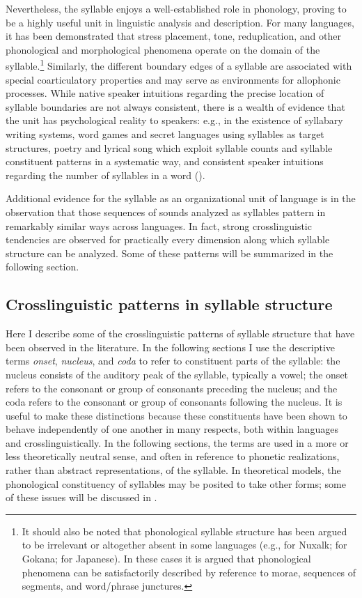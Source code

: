   Nevertheless, the syllable enjoys a well-established role in phonology, proving to be a highly useful unit in linguistic analysis and description. For many languages, it has been demonstrated that stress placement, tone, reduplication, and other phonological and morphological phenomena operate on the domain of the syllable.\footnote{{It should also be noted that phonological syllable structure has been argued to be irrelevant or altogether absent in some languages (e.g., \citealt{Newman1947} for Nuxalk; \citealt{Hyman2011,Hyman2015} for Gokana; \citealt{Labrune2012} for Japanese). In these cases it is argued that phonological phenomena can be satisfactorily described by reference to morae, sequences of segments, and word/phrase junctures.}} Similarly, the different boundary edges of a syllable are associated with special coarticulatory properties and may serve as environments for allophonic processes. While native speaker intuitions regarding the precise location of syllable boundaries are not always consistent, there is a wealth of evidence that the unit has psychological reality to speakers: e.g., in the existence of syllabary writing systems, word games and secret languages using syllables as target structures, poetry and lyrical song which exploit syllable counts and syllable constituent patterns in a systematic way, and consistent speaker intuitions regarding the number of syllables in a word (\citealt{BellHooper1978,Blevins1995,ValléeEtAl2009}).

  Additional evidence for the syllable as an organizational unit of language is in the observation that those sequences of sounds analyzed as syllables pattern in remarkably similar ways across languages. In fact, strong crosslinguistic tendencies are observed for practically every dimension along which syllable structure can be analyzed. Some of these patterns will be summarized in the following section.

\subsection{Crosslinguistic patterns in syllable structure}\label{sec:1.1.2}

  Here I describe some of the crosslinguistic patterns of syllable structure that have been observed in the literature. In the following sections I use the descriptive terms \textit{onset}, \textit{nucleus}, and \textit{coda} to refer to constituent parts of the syllable: the nucleus consists of the auditory peak of the syllable, typically a vowel; the onset refers to the consonant or group of consonants preceding the nucleus; and the coda refers to the consonant or group of consonants following the nucleus. It is useful to make these distinctions because these constituents have been shown to behave independently of one another in many respects, both within languages and crosslinguistically. In the following sections, the terms are used in a more or less theoretically neutral sense, and often in reference to phonetic realizations, rather than abstract representations, of the syllable. In theoretical models, the phonological constituency of syllables may be posited to take other forms; some of these issues will be discussed in .

